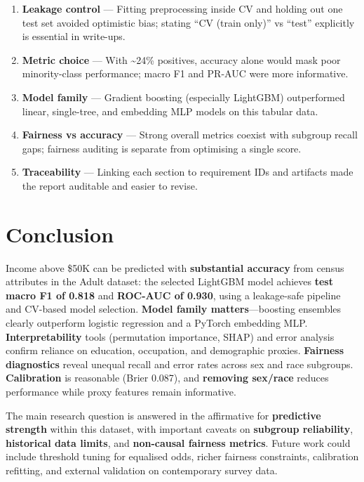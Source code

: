 ﻿\documentclass[11pt,a4paper]{article}
\begin{document}
\begin{enumerate}
  \item \textbf{Leakage control} — Fitting preprocessing inside CV and holding out one test set avoided optimistic bias; stating “CV (train only)” vs “test” explicitly is essential in write-ups.
  \item \textbf{Metric choice} — With \textasciitilde{}24\% positives, accuracy alone would mask poor minority-class performance; macro F1 and PR-AUC were more informative.
  \item \textbf{Model family} — Gradient boosting (especially LightGBM) outperformed linear, single-tree, and embedding MLP models on this tabular data.
  \item \textbf{Fairness vs accuracy} — Strong overall metrics coexist with subgroup recall gaps; fairness auditing is separate from optimising a single score.
  \item \textbf{Traceability} — Linking each section to requirement IDs and artifacts made the report auditable and easier to revise.
\end{enumerate}


\section{Conclusion}

Income above \$50K can be predicted with \textbf{substantial accuracy} from census attributes in the Adult dataset: the selected LightGBM model achieves \textbf{test macro F1 of 0.818} and \textbf{ROC-AUC of 0.930}, using a leakage-safe pipeline and CV-based model selection. \textbf{Model family matters}—boosting ensembles clearly outperform logistic regression and a PyTorch embedding MLP. \textbf{Interpretability} tools (permutation importance, SHAP) and error analysis confirm reliance on education, occupation, and demographic proxies. \textbf{Fairness diagnostics} reveal unequal recall and error rates across sex and race subgroups. \textbf{Calibration} is reasonable (Brier 0.087), and \textbf{removing sex/race} reduces performance while proxy features remain informative.

The main research question is answered in the affirmative for \textbf{predictive strength} within this dataset, with important caveats on \textbf{subgroup reliability}, \textbf{historical data limits}, and \textbf{non-causal fairness metrics}. Future work could include threshold tuning for equalised odds, richer fairness constraints, calibration refitting, and external validation on contemporary survey data.
\end{document}
